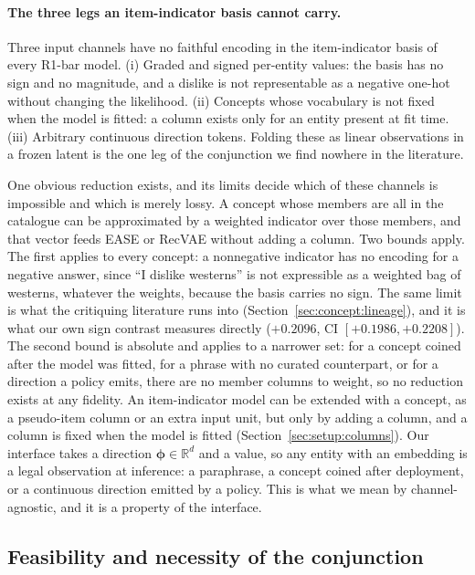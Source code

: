 \documentclass[manuscript,screen,review]{acmart}
\newcommand{\R}{\mathbb{R}}
\newcommand{\bphi}{\boldsymbol{\phi}}
\begin{document}
\paragraph{The three legs an item-indicator basis cannot carry.}
Three input channels have no faithful encoding in the item-indicator basis of every R1-bar model. (i) Graded and signed per-entity values: the basis has no sign and no magnitude, and a dislike is not representable as a negative one-hot without changing the likelihood. (ii) Concepts whose vocabulary is not fixed when the model is fitted: a column exists only for an entity present at fit time. (iii) Arbitrary continuous direction tokens. Folding these as linear observations in a frozen latent is the one leg of the conjunction we find nowhere in the literature.

One obvious reduction exists, and its limits decide which of these channels is impossible and which is merely lossy. A concept whose members are all in the catalogue can be approximated by a weighted indicator over those members, and that vector feeds EASE or RecVAE without adding a column. Two bounds apply. The first applies to every concept: a nonnegative indicator has no encoding for a negative answer, since ``I dislike westerns'' is not expressible as a weighted bag of westerns, whatever the weights, because the basis carries no sign. The same limit is what the critiquing literature runs into (Section~\ref{sec:concept:lineage}), and it is what our own sign contrast measures directly ($+0.2096$, CI $[+0.1986,+0.2208]$). The second bound is absolute and applies to a narrower set: for a concept coined after the model was fitted, for a phrase with no curated counterpart, or for a direction a policy emits, there are no member columns to weight, so no reduction exists at any fidelity. An item-indicator model can be extended with a concept, as a pseudo-item column or an extra input unit, but only by adding a column, and a column is fixed when the model is fitted (Section~\ref{sec:setup:columns}). Our interface takes a direction $\bphi\in\R^{d}$ and a value, so any entity with an embedding is a legal observation at inference: a paraphrase, a concept coined after deployment, or a continuous direction emitted by a policy. This is what we mean by channel-agnostic, and it is a property of the interface.

\subsection{Feasibility and necessity of the conjunction}\label{sec:gap:why}
\end{document}
